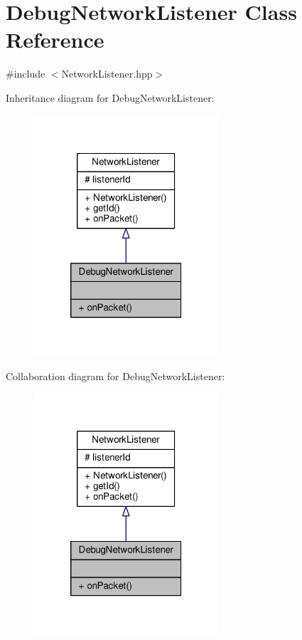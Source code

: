 \hypertarget{class_debug_network_listener}{\section{Debug\-Network\-Listener Class Reference}
\label{class_debug_network_listener}
}


{\ttfamily \#include $<$Network\-Listener.\-hpp$>$}



Inheritance diagram for Debug\-Network\-Listener\-:
\nopagebreak
\begin{figure}[H]
\begin{center}
\leavevmode
\includegraphics[width=194pt]{class_debug_network_listener__inherit__graph}
\end{center}
\end{figure}


Collaboration diagram for Debug\-Network\-Listener\-:
\nopagebreak
\begin{figure}[H]
\begin{center}
\leavevmode
\includegraphics[width=194pt]{class_debug_network_listener__coll__graph}
\end{center}
\end{figure}

